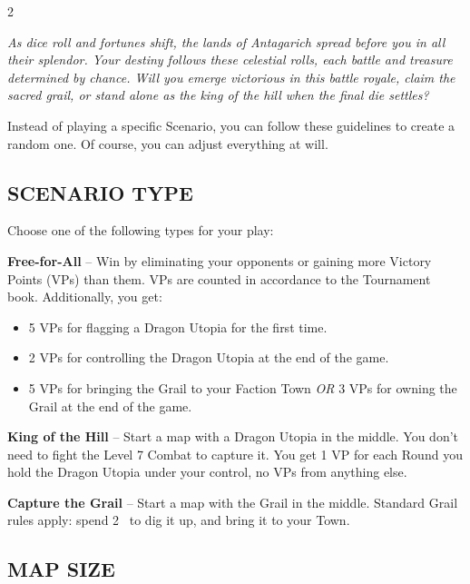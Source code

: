 
\begin{multicols}{2}

\textit{As dice roll and fortunes shift, the lands of Antagarich spread before you in all their splendor.
  Your destiny follows these celestial rolls, each battle and treasure determined by chance.
  Will you emerge victorious in this battle royale, claim the sacred grail, or stand alone as the king of the hill when the final die settles?  %
}

Instead of playing a specific Scenario, you can follow these guidelines to create a random one.
Of course, you can adjust everything at will.

\subsection*{\MakeUppercase{Scenario Type}}

Choose one of the following types for your play:

\textbf{Free-for-All} -- Win by eliminating your opponents or gaining more Victory Points (VPs) than them.
VPs are counted in accordance to the Tournament book.
Additionally, you get:
\begin{itemize}
  \item 5 VPs for flagging a Dragon Utopia for the first time.
  \item 2 VPs for controlling the Dragon Utopia at the end of the game.
  \item 5 VPs for bringing the Grail to your Faction Town \textit{OR} 3 VPs for owning the Grail  at the end of the game.
\end{itemize}

\textbf{King of the Hill} -- Start a map with a Dragon Utopia in the middle.
You don't need to fight the Level 7 Combat to capture it.
You get 1 VP for each Round you hold the Dragon Utopia under your control, no VPs from anything else.

\textbf{Capture the Grail} -- Start a map with the Grail in the middle.
Standard Grail rules apply: spend 2~ to dig it up, and bring it to your Town.
\vspace*{\fill}
\columnbreak

\subsection*{\MakeUppercase{Map Size}}


\end{multicols}
